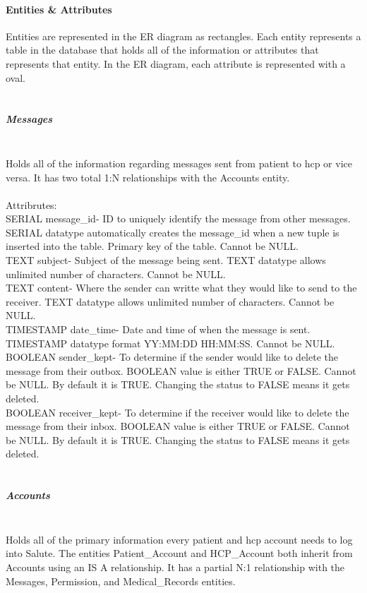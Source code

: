 \documentclass[12pt]{report}
\begin{document}
\paragraph{Entities & Attributes}
Entities are represented in the ER diagram as rectangles.  Each entity represents a table in the database that holds all of the information or attributes that represents that entity.  In the ER diagram, each attribute is represented with a oval.\\ \\

\subparagraph{Messages}\\
Holds all of the information regarding messages sent from patient to hcp or vice versa. It has two total 1:N relationships with the Accounts entity.\\ \\

Attribrutes:\\
SERIAL message_id- ID to uniquely identify the message from other messages. SERIAL datatype automatically creates the message_id when a new tuple is inserted into the table.  Primary key of the table.  Cannot be NULL.\\

TEXT subject- Subject of the message being sent. TEXT datatype allows unlimited number of characters.  Cannot be NULL.\\

TEXT content- Where the sender can writte what they would like to send to the receiver.  TEXT datatype allows unlimited number of characters.  Cannot be NULL.\\

TIMESTAMP date_time- Date and time of when the message is sent.  TIMESTAMP datatype format YY:MM:DD HH:MM:SS.  Cannot be NULL.\\

BOOLEAN sender_kept- To determine if the sender would like to delete the message from their outbox.  BOOLEAN value is either TRUE or FALSE.  Cannot be NULL.  By default it is TRUE.  Changing the status to FALSE means it gets deleted.\\

BOOLEAN receiver_kept- To determine if the receiver would like to delete the message from their inbox.  BOOLEAN value is either TRUE or FALSE.  Cannot be NULL.  By default it is TRUE.  Changing the status to FALSE means it gets deleted.\\ \\

\subparagraph{Accounts}\\
Holds all of the primary information every patient and hcp account needs to log into Salute.  The entities Patient_Account and HCP_Account both inherit from Accounts using an IS A relationship.  It has a partial N:1 relationship with the Messages, Permission, and Medical_Records entities.\\ \\
\end{document}
